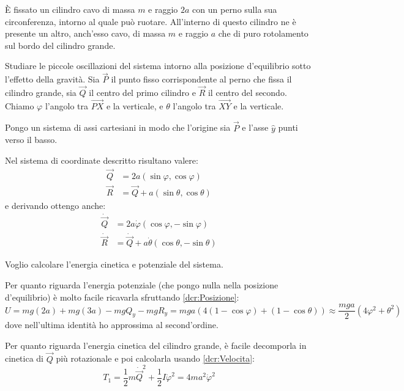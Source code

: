\documentclass[../main.tex]{subfiles}
\begin{document}
\textex
È fissato un cilindro cavo di massa $m$ e raggio $2a$ con un perno sulla sua circonferenza, intorno al quale può ruotare.
All'interno di questo cilindro ne è presente un altro, anch'esso cavo, di massa $m$ e raggio $a$ che di puro rotolamento sul bordo del cilindro grande.

Studiare le piccole oscillazioni del sistema intorno alla posizione d'equilibrio sotto l'effetto della gravità.
\solution
Sia $\vec P$ il punto fisso corrispondente al perno che fissa il cilindro grande, sia $\vec Q$ il centro del primo cilindro e $\vec R$ il centro del secondo. Chiamo $\varphi$ l'angolo tra $\overrightarrow{PX}$ e la verticale, e $\theta$ l'angolo tra $\overrightarrow{XY}$ e la verticale.

Pongo un sistema di assi cartesiani in modo che l'origine sia $\vec P$ e l'asse $\hat y$ punti verso il basso.

Nel sistema di coordinate descritto risultano valere:
\begin{equation}\begin{split}\label{dcr:Posizione}
	\vec Q&=2a(\sin\varphi,\cos\varphi) \\
	\vec R&=\vec Q + a(\sin\theta,\cos\theta)
\end{split}\end{equation}
e derivando ottengo anche:
\begin{equation}\begin{split}\label{dcr:Velocita}
	\dot{\vec Q}&=2a\dot{\varphi}(\cos\varphi,-\sin\varphi) \\
	\dot{\vec R}&=\dot{\vec Q} + a\dot{\theta}(\cos\theta,-\sin\theta)
\end{split}\end{equation}

Voglio calcolare l'energia cinetica e potenziale del sistema.

Per quanto riguarda l'energia potenziale (che pongo nulla nella posizione d'equilibrio) è molto facile ricavarla sfruttando \cref{dcr:Posizione}:
\begin{equation}\label{dcr:Potenziale}
	U=mg(2a)+mg(3a)-mgQ_y-mgR_y=mga\left(4(1-\cos\varphi)+(1-\cos\theta)\right)
	\approx \frac{mga}2\left(4\varphi^2+\theta^2\right)
\end{equation}
dove nell'ultima identità ho approssima al second'ordine.

Per quanto riguarda l'energia cinetica del cilindro grande, è facile decomporla in cinetica di $\vec Q$ più rotazionale e poi calcolarla usando \cref{dcr:Velocita}:
\begin{equation}\label{dcr:Cinetica1}
	T_1=\frac 12 m {\dot{\vec Q}}^2+\frac 12I{\dot\varphi}^2=4ma^2\dot\varphi^2
\end{equation}
\end{document}
